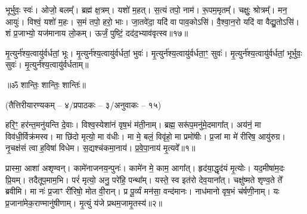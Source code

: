 भूर्भुवः॒ स्वः॑।
ओजो॒ बलम्᳚।
ब्रह्म॑ क्ष॒त्रम्।
यशो॑ म॒हत्।
स॒त्यं तपो॒ नाम॑।
रू॒पम॒मृतम्᳚।
चक्षुः॒ श्रोत्रम्᳚।
मन॒ आयुः॑।
विश्वं॒ यशो॑ म॒हः।
स॒मं तपो॒ हरो॒ भाः।
जा॒तवे॑दा॒ यदि॑ वा पाव॒कोऽसि॑।
वै॒श्वा॒न॒रो यदि॑ वा वैद्यु॒तोऽसि॑।
शं प्र॒जाभ्यो॒ यज॑मानाय लो॒कम्।
ऊर्जं॒ पुष्टिं॒ दद॑द॒भ्याव॑वृत्स्व॥१७॥
   
मृ॒त्युर्न॑श्य॒त्वायु॑र्वर्धतां॒ भूः।
मृ॒त्युर्न॑श्य॒त्वायु॑र्वर्धतां॒ भुवः॑।
मृ॒त्युर्न॑श्य॒त्वायु॑र्वर्धता॒ꣳ॒ सुवः॑।
मृ॒त्युर्न॑श्य॒त्वायु॑र्वर्धतां॒ भूर्भुवः॒ सुवः॑।
मृ॒त्युर्न॑श्य॒त्वायु॑र्वर्धताम्॥

\centerline{॥ॐ शान्तिः॒ शान्तिः॒ शान्तिः॑॥}
\let\parskip\oldparskip

\closesection
\centerline{\normalsize (तैत्तिरीयारण्यकम् – ४/प्रपाठकः – ३/अनुवाकः – १५)}
हरि॒ꣳ॒ हर॑न्त॒मनु॑यन्ति दे॒वाः। विश्व॒स्येशा॑नं वृष॒भं म॑ती॒नाम्। ब्रह्म॒ सरू॑प॒मनु॑मे॒दमागा᳚त्। अय॑नं॒ मा विव॑धी॒र्विक्र॑मस्व। मा छि॑दो मृत्यो॒ मा व॑धीः। मा मे॒ बलं॒  विवृ॑हो॒ मा प्रमो॑षीः। प्र॒जां मा मे॑ रीरिष॒ आयु॑रुग्र। नृ॒चक्ष॑सं त्वा ह॒विषा॑ विधेम। स॒द्यश्च॑कमा॒नाय॑। प्र॒वे॒पा॒नाय॑ मृ॒त्यवे᳚॥१॥

प्रास्मा॒ आशा॑ अशृण्वन्। कामे॑नाजनय॒न्पुनः॑। कामे॑न मे॒ काम॒ आगा᳚त्। हृद॑या॒द्धृद॑यं मृ॒त्योः। यद॒मीषा॑म॒दः प्रि॒यम्। तदैतूप॒माम॒भि। परं॑ मृत्यो॒ अनु॒ परे॑हि॒ पन्था᳚म्। यस्ते॒ स्व इत॑रो देव॒याना᳚त्। चक्षु॑ष्मते शृण्व॒ते ते᳚ ब्रवीमि। मा नः॑ प्र॒जाꣳ री॑रिषो॒ मोत वी॒रान्। प्र पू॒र्व्यं मन॑सा॒ वन्द॑मानः। नाध॑मानो वृष॒भं च॑र्\mbox{}षणी॒नाम्। यः प्र॒जाना॑मेक॒राण्मानु॑षीणाम्। मृ॒त्युं य॑जे प्रथम॒जामृ॒तस्य॑॥२॥